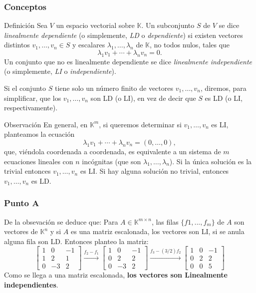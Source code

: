 \documentclass[a4paper,12pt]{article}
\begin{document}
\subsubsection{Conceptos}
\begin{defbox}{Definición}
    Sea $V$ un espacio vectorial sobre $\mathds{K}$. Un subconjunto $S$ de $V$ se dice \textit{linealmente dependiente} (o simplemente, \textit{LD} o \textit{dependiente}) si existen vectores distintos $v_1,\ldots,v_n \in S$  y escalares $\lambda_1,\ldots,\lambda_n$ de $\mathds{K}$, no todos nulos, tales que 	
        \begin{equation*}
            \lambda_1v_1+\cdots+\lambda_nv_n=0.
        \end{equation*}
        Un conjunto que no es linealmente dependiente se dice \textit{linealmente independiente} (o simplemente, \textit{LI} o \textit{independiente}).
        
        Si el conjunto $S$ tiene solo un número finito de vectores $v_1,\ldots,v_n$, diremos, para simplificar, que los $v_1,\ldots,v_n$ son LD (o LI), en vez de decir
        que $S$ es LD (o LI, respectivamente).
\end{defbox}
\begin{obbox}{Observación}
    En  general,  en $\mathds{K}^m$, si queremos determinar si  $v_1,\ldots,v_n$ es LI, planteamos la ecuación  
    \begin{equation*}
    \lambda_1v_1+\cdots+\lambda_nv_n=(0,\ldots,0),
    \end{equation*}
    que, viéndola coordenada a coordenada, es equivalente a un sistema de $m$ ecuaciones lineales con  $n$ incógnitas (que son $\lambda_1,\ldots,\lambda_n$). Si  la única solución es la trivial entonces $v_1,\ldots,v_n$ es LI. Si hay alguna solución no trivial, entonces $v_1,\ldots,v_n$ es LD. 
\end{obbox}
\subsubsection{Punto A}
De la obsevación se deduce que: Para $A\in\mathds{K}^{m\times n}$, las filas $\{ 
f1,...,f_m \}$ de $A$ son vectores de $\mathds{K}^n$ y si $A$ es una matriz escalonada, los vectores son LI, si se anula alguna fila son LD.
\newline Entonces planteo la matriz:
$$
\begin{bmatrix}
1 & 0 & -1\\ 
1 & 2 & 1\\ 
0 & -3 & 2 
\end{bmatrix}
\xrightarrow[]{f_2-f_1}
\begin{bmatrix}
1 & 0 & -1\\ 
0 & 2 & 2\\ 
0 & -3 & 2 
\end{bmatrix}
\xrightarrow[]{f_3-(3/2)f_2}
\begin{bmatrix}
1 & 0 & -1\\ 
0 & 2 & 2\\ 
0 & 0 & 5 
\end{bmatrix}
$$
Como se llega a una matriz escalonada, \textbf{los vectores son Linealmente independientes}.
\end{document}
